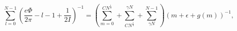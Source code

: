 \begin{equation}
\label{Eq_A30}
\sum^{N-1}_{l=0}
  \left( \frac{e\Phi}{2\pi} - l - 1 + \frac{1}{2I} \right)^{-1}
  = \left( \sum^{CN^{\frac{1}{3}}}_{m=0}
  + \sum^{\gamma N}_{CN^{\frac{1}{3}}}
  + \sum^{N-1}_{\gamma N} \right) (m + \epsilon + g(m))^{-1},
\end{equation}

